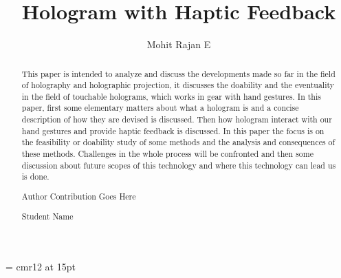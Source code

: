 \documentclass{fisatproject}
\title{Hologram with Haptic Feedback}
\author{Mohit Rajan E}
\begin{document}
\maketitle
\makecert
\font\secfont =  cmr12 at 15pt
\newpage
{}
\setcounter{page}{1}
\thispagestyle{plain}
\renewcommand\abstractname{ABSTRACT}
\begin{abstract}
\vspace{5cm}
This paper is intended to analyze and discuss the developments made so far in the field of holography and holographic projection, it discusses the doability and the eventuality in the field of touchable holograms, which works in gear with hand gestures. In this paper, first some elementary matters about what a hologram is and a concise description of how they are devised is discussed. Then how hologram interact with our hand gestures and provide haptic feedback is discussed. In this paper the focus is on the feasibility or doability study of some methods and the analysis and consequences of these methods. Challenges in the whole process will be confronted and then some discussion about future scopes of this technology and where this technology can lead us is done.
\end{abstract}



\newpage
\renewcommand\abstractname{Contribution by Author}
\thispagestyle{plain}
\begin{abstract}
\vspace{5cm}
Author Contribution  Goes Here
\vspace{1cm}
\begin{flushright}
Student Name
\end{flushright}
\end{abstract}
\end{document}

